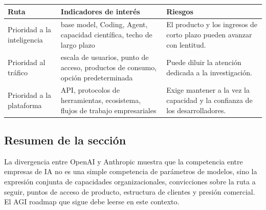 \noindent\begin{tabularx}{\textwidth}{p{}p{}X}
\toprule
Ruta & Indicadores de interés & Riesgos \\
\midrule
Prioridad a la inteligencia & base model, Coding, Agent, capacidad científica, techo de largo plazo & El producto y los ingresos de corto plazo pueden avanzar con lentitud. \\
Prioridad al tráfico & escala de usuarios, punto de acceso, productos de consumo, opción predeterminada & Puede diluir la atención dedicada a la investigación. \\
Prioridad a la plataforma & API, protocolos de herramientas, ecosistema, flujos de trabajo empresariales & Exige mantener a la vez la capacidad y la confianza de los desarrolladores. \\
\bottomrule
\end{tabularx}

\subsection{Resumen de la sección}

La divergencia entre OpenAI y Anthropic muestra que la competencia entre empresas de IA no es una simple competencia de parámetros de modelos, sino la expresión conjunta de capacidades organizacionales, convicciones sobre la ruta a seguir, puntos de acceso de producto, estructura de clientes y presión comercial. El AGI roadmap que sigue debe leerse en este contexto.
